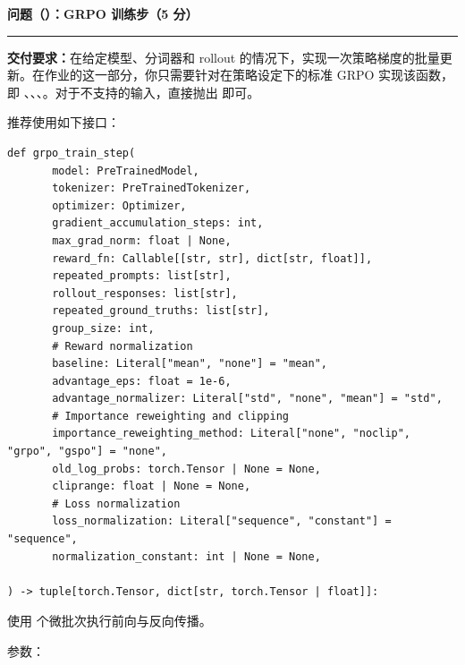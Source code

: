 \medskip
\noindent\textbf{问题（）：GRPO 训练步（5 分）}
\par\nobreak\smallskip\hrule\nobreak\medskip

\textbf{交付要求：}在给定模型、分词器和 rollout 的情况下，实现一次策略梯度的批量更新。在作业的这一部分，你只需要针对在策略设定下的标准 GRPO 实现该函数，即 、、、。对于不支持的输入，直接抛出  即可。

推荐使用如下接口：

\begin{lstlisting}
def grpo_train_step(
       model: PreTrainedModel,
       tokenizer: PreTrainedTokenizer,
       optimizer: Optimizer,
       gradient_accumulation_steps: int,
       max_grad_norm: float | None,
       reward_fn: Callable[[str, str], dict[str, float]],
       repeated_prompts: list[str],
       rollout_responses: list[str],
       repeated_ground_truths: list[str],
       group_size: int,
       # Reward normalization
       baseline: Literal["mean", "none"] = "mean",
       advantage_eps: float = 1e-6,
       advantage_normalizer: Literal["std", "none", "mean"] = "std",
       # Importance reweighting and clipping
       importance_reweighting_method: Literal["none", "noclip", "grpo", "gspo"] = "none",
       old_log_probs: torch.Tensor | None = None,
       cliprange: float | None = None,
       # Loss normalization
       loss_normalization: Literal["sequence", "constant"] = "sequence",
       normalization_constant: int | None = None,

) -> tuple[torch.Tensor, dict[str, torch.Tensor | float]]:
\end{lstlisting}

使用  个微批次执行前向与反向传播。

参数：

